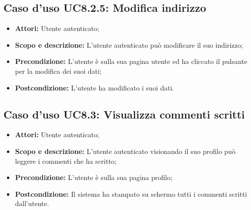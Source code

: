 \documentclass[12pt,a4paper,titlepage]{article}
\begin{document}
	\subsection{Caso d'uso UC8.2.5: Modifica indirizzo}
	\label{UC8.2.5}
	\begin{itemize}
		\item \textbf{Attori: }Utente autenticato;
		\item \textbf{Scopo e descrizione: }L'utente autenticato può modificare il suo indirizzo;
		\item \textbf{Precondizione: }L'utente è sulla sua pagina utente ed ha cliccato il pulsante per la modifica dei suoi dati;
		\item \textbf{Postcondizione: }L'utente ha modificato i suoi dati.
	\end{itemize}
	\subsection{Caso d'uso UC8.3: Visualizza commenti scritti}
	\label{UC8.3}
	\begin{itemize}
		\item \textbf{Attori: }Utente autenticato;
		\item \textbf{Scopo e descrizione: }L'utente autenticato visionando il suo profilo può leggere i commenti che ha scritto;
		\item \textbf{Precondizione: }L'utente è sulla sua pagina profilo;
		\item \textbf{Postcondizione: }Il sistema ha stampato su schermo tutti i commenti scritti dall'utente.
	\end{itemize}
\end{document}
